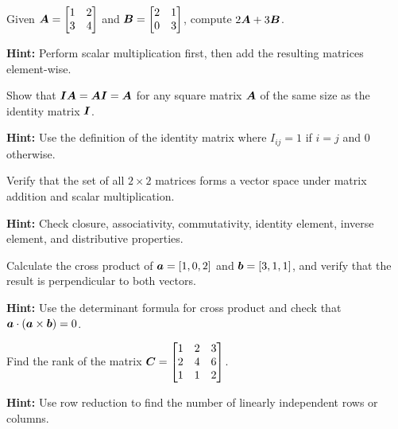 \begin{problem}
Given $\boldsymbol{A} = \begin{bmatrix} 1 & 2 \\ 3 & 4 \end{bmatrix}$ and $\boldsymbol{B} = \begin{bmatrix} 2 & 1 \\ 0 & 3 \end{bmatrix}$, compute $2\boldsymbol{A} + 3\boldsymbol{B}$.

\textbf{Hint:} Perform scalar multiplication first, then add the resulting matrices element-wise.
\end{problem}

\begin{problem}
Show that $\boldsymbol{I}\boldsymbol{A} = \boldsymbol{A}\boldsymbol{I} = \boldsymbol{A}$ for any square matrix $\boldsymbol{A}$ of the same size as the identity matrix $\boldsymbol{I}$.

\textbf{Hint:} Use the definition of the identity matrix where $I_{ij} = 1$ if $i = j$ and $0$ otherwise.
\end{problem}

\begin{problem}
Verify that the set of all $2 \times 2$ matrices forms a vector space under matrix addition and scalar multiplication.

\textbf{Hint:} Check closure, associativity, commutativity, identity element, inverse element, and distributive properties.
\end{problem}

\begin{problem}
Calculate the cross product of $\boldsymbol{a} = [1, 0, 2]$ and $\boldsymbol{b} = [3, 1, 1]$, and verify that the result is perpendicular to both vectors.

\textbf{Hint:} Use the determinant formula for cross product and check that $\boldsymbol{a} \cdot (\boldsymbol{a} \times \boldsymbol{b}) = 0$.
\end{problem}

\begin{problem}
Find the rank of the matrix $\boldsymbol{C} = \begin{bmatrix} 1 & 2 & 3 \\ 2 & 4 & 6 \\ 1 & 1 & 2 \end{bmatrix}$.

\textbf{Hint:} Use row reduction to find the number of linearly independent rows or columns.
\end{problem}

